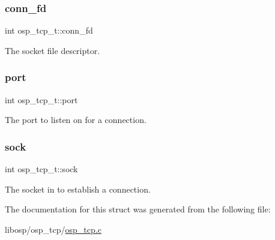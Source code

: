 \subsubsection{\texorpdfstring{conn\+\_\+fd}{conn\_fd}}
{\footnotesize\ttfamily int osp\+\_\+tcp\+\_\+t\+::conn\+\_\+fd}



The socket file descriptor. 

\mbox{\label{structosp__tcp__t_a2b2fad6184d1ce632032645f85469657}} 
\subsubsection{\texorpdfstring{port}{port}}
{\footnotesize\ttfamily int osp\+\_\+tcp\+\_\+t\+::port}



The port to listen on for a connection. 

\mbox{\label{structosp__tcp__t_a944dbf95de27ec773bf9b4e169a30661}} 
\subsubsection{\texorpdfstring{sock}{sock}}
{\footnotesize\ttfamily int osp\+\_\+tcp\+\_\+t\+::sock}



The socket in to establish a connection. 



The documentation for this struct was generated from the following file\+:\begin{DoxyCompactItemize}
\item 
libosp/osp\+\_\+tcp/\mbox{\hyperlink{osp__tcp_8c}{osp\+\_\+tcp.\+c}}\end{DoxyCompactItemize}
